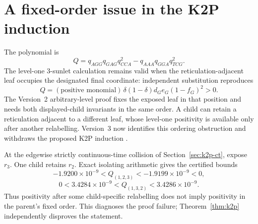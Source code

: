\documentclass[11pt]{article}
\theoremstyle{remark}\newtheorem{remark}[theorem]{Remark}
\begin{document}
\section{A fixed-order issue in the K2P induction}\label{sec:induction}
The polynomial is
\begin{equation}\label{eq:Q}Q=q_{AGG}q_{GAG}q_{CCA}^{2}-q_{AAA}q_{GGA}q_{TCG}^{2}.\end{equation}
The level-one 3-sunlet calculation remains valid when the reticulation-adjacent leaf occupies the designated final coordinate: independent substitution reproduces
\[
Q=(\text{positive monomial})\,\delta(1-\delta)d_Ge_G(1-f_G)^2>0.
\]
The Version~2 arbitrary-level proof fixes the exposed leaf in that position and needs both displayed-child invariants in the same order. A child can retain a reticulation adjacent to a different leaf, whose level-one positivity is available only after another relabelling. Version~3 now identifies this ordering obstruction and withdraws the proposed K2P induction \cite{BritsEtAl2026v3}.

At the edgewise strictly continuous-time collision of Section~\ref{sec:k2p-ct}, expose $r_3$. One child retains $r_2$. Exact isolating arithmetic gives the certified bounds
\[
-1.9200\times10^{-9}<Q_{(1,2,3)}<-1.9199\times10^{-9}<0,
\]
\[
0<3.4284\times10^{-9}<Q_{(1,3,2)}<3.4286\times10^{-9}.
\]
Thus positivity after some child-specific relabelling does not imply positivity in the parent's fixed order. This diagnoses the proof failure; Theorem~\ref{thm:k2p} independently disproves the statement.
\end{document}
